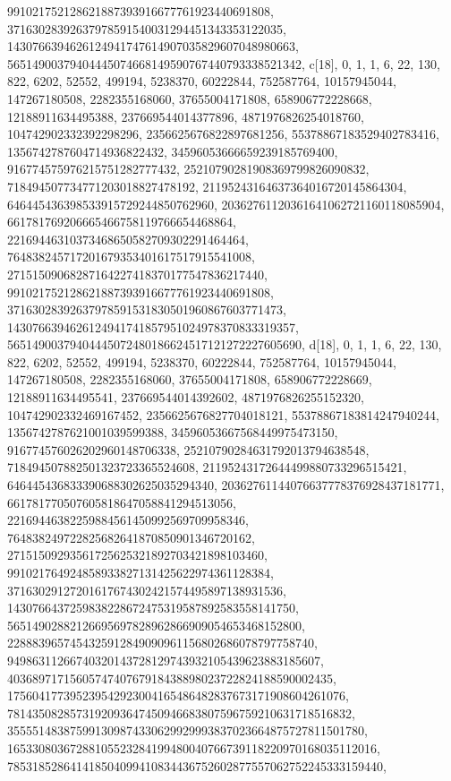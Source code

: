 {{{   991021752128621887393916677761923440691808, 
   37163028392637978591540031294451343353122035, 
   1430766394626124941747614907035829607048980663, 
   56514900379404445074668149590767440793338521342}}, 
 {c[18], {0, 1, 1, 6, 22, 130, 822, 6202, 52552, 499194, 5238370, 60222844, 
   752587764, 10157945044, 147267180508, 2282355168060, 37655004171808, 
   658906772228668, 12188911634495388, 237669544014377896, 
   4871976826254018760, 104742902332392298296, 2356625676822897681256, 
   55378867183529402783416, 1356742787604714936822432, 
   34596053666659239185769400, 916774575976215751282777432, 
   25210790281908369799826090832, 718494507734771203018827478192, 
   21195243164637364016720145864304, 646445436398533915729244850762960, 
   20362761120361641062721160118085904, 661781769206665466758119766654468864, 
   22169446310373468650582709302291464464, 
   764838245717201679353401617517915541008, 
   27151509068287164227418370177547836217440, 
   991021752128621887393916677761923440691808, 
   37163028392637978591531830501960867603771473, 
   1430766394626124941741857951024978370833319357, 
   56514900379404445072480186624517121272227605690}}, 
 {d[18], {0, 1, 1, 6, 22, 130, 822, 6202, 52552, 499194, 5238370, 60222844, 
   752587764, 10157945044, 147267180508, 2282355168060, 37655004171808, 
   658906772228669, 12188911634495541, 237669544014392602, 
   4871976826255152320, 104742902332469167452, 2356625676827704018121, 
   55378867183814247940244, 1356742787621001039599388, 
   34596053667568449975473150, 916774576026202960148706338, 
   25210790284631792013794638548, 718494507882501323723365524608, 
   21195243172644499880733296515421, 646445436833390688302625035294340, 
   20362761144076637778376928437181771, 661781770507605818647058841294513056, 
   22169446382259884561450992569709958346, 
   764838249722825682641870850901346720162, 
   27151509293561725625321892703421898103460, 
   991021764924858933827131425622974361128384, 
   37163029127201617674302421574495897138931536, 
   1430766437259838228672475319587892583558141750, 
   56514902882126695697828962866909054653468152800, 
   2288839657454325912849090961156802686078797758740, 
   94986311266740320143728129743932105439623883185607, 
   4036897171560574740767918438898023722824188590002435, 
   175604177395239542923004165486482837673171908604261076, 
   7814350828573192093647450946683807596759210631718516832, 
   355551483875991309874330629929993837023664875727811501780, 
   16533080367288105523284199480040766739118220970168035112016, 
   785318528641418504099410834436752602877557062752245333159440, 
}}}
